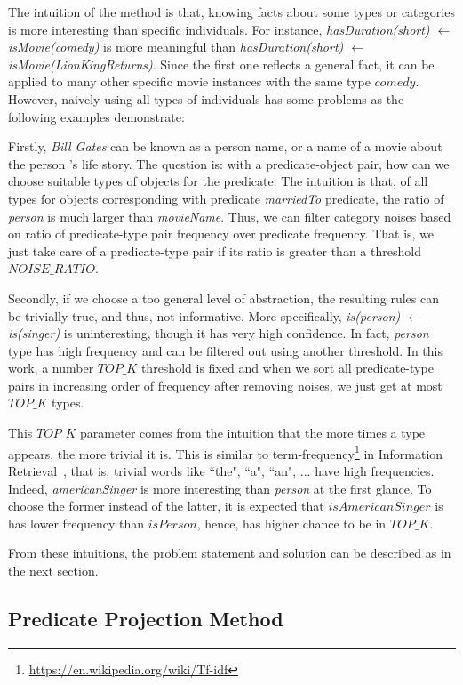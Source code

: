 \documentclass{acm_proc_article-sp}
\begin{document}
The intuition of the method is that, knowing facts about some types or categories is more interesting than specific individuals. For instance, \textit{hasDuration(short) $\leftarrow$ isMovie(comedy)} is more meaningful than \textit{hasDuration(short) $\leftarrow$ isMovie(LionKingReturns)}. Since the first one reflects a general fact, it can be applied to many other specific movie instances with the same type $comedy$. However, naively using all types of individuals has some problems as the following examples demonstrate:

Firstly, \textit{Bill Gates} can be known as a person name, or a name of a movie about the person 's life story. The question is: with a predicate-object pair, how can we choose suitable types of objects for the predicate. The intuition is that, of all types for objects corresponding with predicate \textit{marriedTo} predicate, the ratio of \textit{person} is much larger than \textit{movieName}. Thus, we can filter category noises based on ratio of predicate-type pair frequency over predicate frequency. That is, we just take care of a predicate-type pair if its ratio is greater than a threshold $NOISE\_RATIO$.

Secondly, if we choose a too general level of abstraction, the resulting rules can be trivially true, and thus, not informative. More specifically, \textit{is(person) $\leftarrow$ is(singer)} is uninteresting, though it has very high confidence. In fact, \textit{person} type has high frequency and can be filtered out using another threshold. In this work, a number $TOP\_K$ threshold is fixed and when we sort all predicate-type pairs in increasing order of frequency after removing noises, we just get at most $TOP\_K$ types.

This $TOP\_K$ parameter comes from the intuition that the more times a type appears, the more trivial it is. This is similar to term-frequency\footnote{\url{https://en.wikipedia.org/wiki/Tf-idf}} in Information Retrieval~\cite{ref2}, that is, trivial words like ``the", ``a", ``an", ... have high frequencies. Indeed, \textit{americanSinger} is more interesting than \textit{person} at the first glance. To choose the former instead of the latter, it is expected that $isAmericanSinger$ is has lower frequency than $isPerson$, hence, has higher chance to be in $TOP\_K$.

From these intuitions, the problem statement and solution can be described as in the next section.

\subsection{Predicate Projection Method\\}
\end{document}
